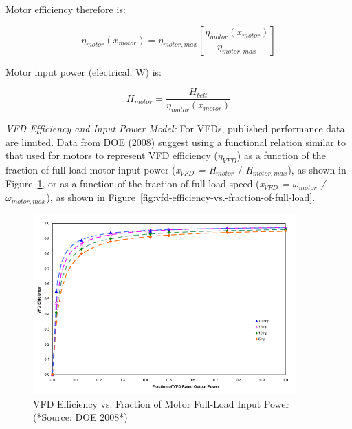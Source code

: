 {{{Motor efficiency therefore is:

\begin{equation}
{\eta_{motor}}({x_{motor}}) = {\eta_{motor,max}}\left[ {\frac{{{\eta_{motor}}({x_{motor}})}}{{{\eta_{motor,max}}}}} \right]
\end{equation}

Motor input power (electrical, W) is:

\begin{equation}
{H_{motor}} = \frac{{{H_{belt}}}}{{{\eta_{motor}}({x_{motor}})}}
\end{equation}

\emph{VFD Efficiency and Input Power Model:} For VFDs, published performance data are limited. Data from DOE (2008) suggest using a functional relation similar to that used for motors to represent VFD efficiency (\(\eta_{VFD}\)) as a function of the fraction of full-load motor input power (\emph{x\(_{VFD}\) = H\(_{motor}\)} / \emph{H\(_{motor,max}\)}), as shown in Figure~\ref{fig:vfd-efficiency-vs.-fraction-of-motor-full}, or as a function of the fraction of full-load speed (\emph{x\(_{VFD}\) = \(\omega_{motor}\) / \(\omega_{motor,max}\)}), as shown in Figure~\ref{fig:vfd-efficiency-vs.-fraction-of-full-load}.

\begin{figure}[hbtp] %
\centering
\includegraphics[width=0.9\textwidth, height=0.9\textheight, keepaspectratio=true]{media/image4923.svg.png}
\caption{VFD Efficiency vs. Fraction of Motor Full-Load Input Power (*Source: DOE 2008*) \protect \label{fig:vfd-efficiency-vs.-fraction-of-motor-full}}
\end{figure}

}}}
